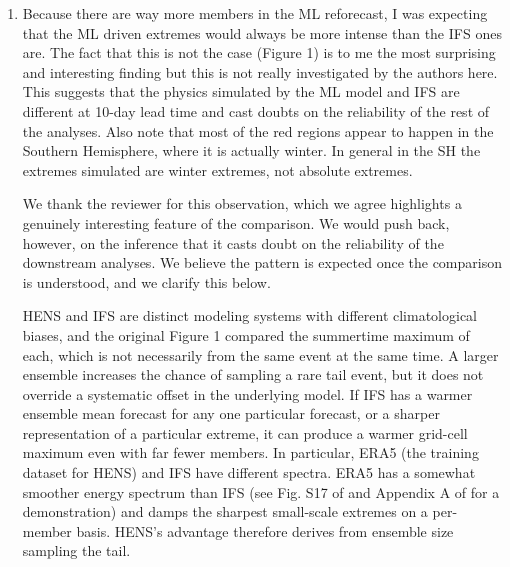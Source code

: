 \documentclass[11pt]{article}
\newcommand{\newTxt}{\textcolor{cadmiumgreen}}
\begin{document}
\begin{enumerate}
\newTxt{The conventional approach to sampling these short-horizon evolutions uses small NWP ensembles, whose limited size truncates the forecast distribution and misses roughly 6\% of events (Fig. S10 in the new manuscript). We address this by expending our full compute and memory budget on a massive ensemble of a single summer, rather than smaller ensembles spanning many summers. We do not aim to characterize the full climatological distribution of extremes or to estimate return periods; we aim to improve sampling of the short-term forecast distribution conditioned on the observed summer.}
    
    \item Because there are way more members in the ML reforecast, I was expecting that the ML driven extremes would always be more intense than the IFS ones are. The fact that this is not the case (Figure 1) is to me the most surprising and interesting finding but this is not really investigated by the authors here. This  suggests that the physics simulated by the ML model and IFS are different at 10-day lead time and cast doubts on the reliability of the rest of the analyses. Also note that most of the red regions appear to happen in the Southern Hemisphere, where it is actually winter. In general in the SH the extremes simulated are winter extremes, not absolute extremes.

    \newTxt{We thank the reviewer for this observation, which we agree highlights a genuinely interesting feature of the comparison. We would push back, however, on the inference that it casts doubt on the reliability of the downstream analyses. We believe the pattern is expected once the comparison is understood, and we clarify this below.}
    
\newTxt{HENS and IFS are distinct modeling systems with different climatological biases, and the original Figure 1 compared the summertime maximum of each, which is not necessarily from the same event at the same time. A larger ensemble increases the chance of sampling a rare tail event, but it does not override a systematic offset in the underlying model. If IFS has a warmer ensemble mean forecast for any one particular forecast, or a sharper representation of a particular extreme, it can produce a warmer grid-cell maximum even with far fewer members. In particular, ERA5 (the training dataset for HENS) and IFS have different spectra. ERA5 has a somewhat smoother energy spectrum than IFS (see Fig. S17 of \citet{Zhong2025} and Appendix A of \citet{Mahesh2024hugeensemblesidesign} for a demonstration) and damps the sharpest small-scale extremes on a per-member basis. HENS's advantage therefore derives from ensemble size sampling the tail.}


\end{enumerate}
\end{document}
